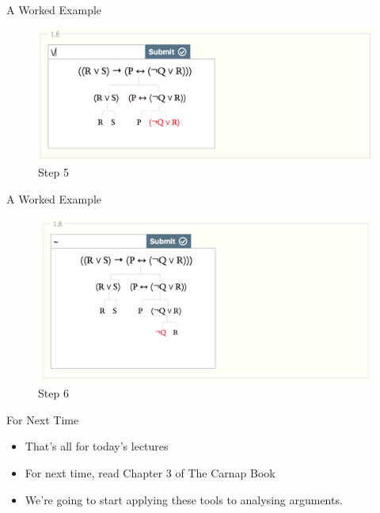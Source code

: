 \documentclass[
  ignorenonframetext,
]{beamer}
\providecommand{\tightlist}{%
  \setlength{\itemsep}{0pt}\setlength{\parskip}{0pt}}
\renewcommand{\,}{\text{, }}
\begin{document}
\begin{frame}{A Worked Example}
\protect\hypertarget{a-worked-example-4}{}

\begin{figure}
\centering
\includegraphics{../images/class02/5.png}
\caption{Step 5}
\end{figure}

\end{frame}

\begin{frame}{A Worked Example}
\protect\hypertarget{a-worked-example-5}{}

\begin{figure}
\centering
\includegraphics{../images/class02/6.png}
\caption{Step 6}
\end{figure}

\end{frame}

\begin{frame}{For Next Time}
\protect\hypertarget{for-next-time}{}

\begin{itemize}
\tightlist
\item
  That's all for today's lectures
\item
  For next time, read Chapter 3 of The Carnap Book
\item
  We're going to start applying these tools to analysing arguments.
\end{itemize}

\end{frame}
\end{document}
